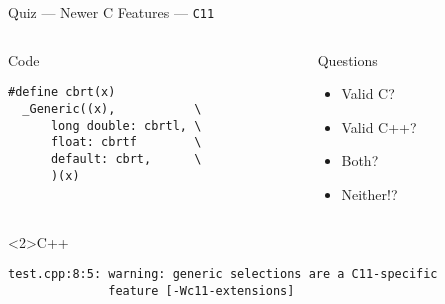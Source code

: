\documentclass[presentation,aspectratio=169]{beamer}
\begin{document}
\begin{frame}[fragile,label={sec:org23c4234}]{Quiz — Newer C Features — \texttt{C11}}
\begin{columns}
\begin{column}{0.48\columnwidth}
\begin{block}{Code}
\begin{verbatim}
#define cbrt(x)
  _Generic((x),           \
      long double: cbrtl, \
      float: cbrtf        \
      default: cbrt,      \
      )(x)
\end{verbatim}
\end{block}
\end{column}

\begin{column}{0.48\columnwidth}
\begin{block}{Questions}
\begin{itemize}
\item Valid C?
\item Valid C++?
\item Both?
\item Neither!?
\end{itemize}
\end{block}
\end{column}
\end{columns}

\begin{block}<2>{C++}
\begin{verbatim}
test.cpp:8:5: warning: generic selections are a C11-specific
              feature [-Wc11-extensions]
\end{verbatim}
\end{block}
\end{frame}

\end{document}
